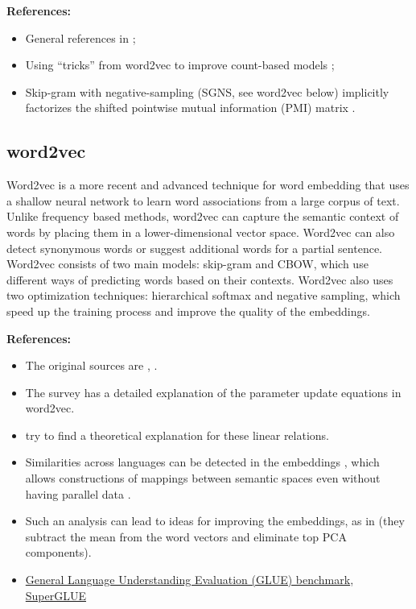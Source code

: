 \documentclass[11pt, a4paper]{amsart}
\begin{document}
\noindent \textbf{References:}
\begin{itemize}
    \item General references in ;
    \item Using ``tricks'' from word2vec to improve count-based models \cite{levy-etal-2015-improving};
    \item Skip-gram with negative-sampling (SGNS, see word2vec below) implicitly factorizes the shifted pointwise mutual information (PMI) matrix \cite{NIPS2014_feab05aa}.
\end{itemize}

\subsection{word2vec}

Word2vec is a more recent and advanced technique for word embedding that uses a shallow neural network to learn word associations from a large corpus of text.
Unlike frequency based methods, word2vec can capture the semantic context of words by placing them in a lower-dimensional vector space.
Word2vec can also detect synonymous words or suggest additional words for a partial sentence. 
Word2vec consists of two main models: skip-gram and CBOW, which use different ways of predicting words based on their contexts.
Word2vec also uses two optimization techniques: hierarchical softmax and negative sampling, which speed up the training process and improve the quality of the embeddings.

\noindent \textbf{References:}
\begin{itemize}
	\item The original sources are
	\cite{DBLP:journals/corr/abs-1301-3781},
	\cite{DBLP:journals/corr/MikolovSCCD13}.
	\item The survey \cite{DBLP:journals/corr/Rong14} has a detailed explanation of the parameter update equations in word2vec.
    \item \cite{DBLP:journals/corr/abs-1901-09813} try to find a theoretical explanation for these linear relations.
    \item Similarities across languages can be detected in the embeddings \cite{DBLP:journals/corr/MikolovLS13}, which allows constructions of mappings between semantic spaces even without having parallel data \cite{DBLP:journals/corr/abs-1710-04087}.
    \item Such an analysis can lead to ideas for improving the embeddings, as in \cite{DBLP:journals/corr/MuBV17} (they subtract the mean from the word vectors and eliminate top PCA components).
    \item \href{https://gluebenchmark.com/}{General Language Understanding Evaluation (GLUE) benchmark}, \href{https://super.gluebenchmark.com/}{SuperGLUE}
\end{itemize}
\end{document}
